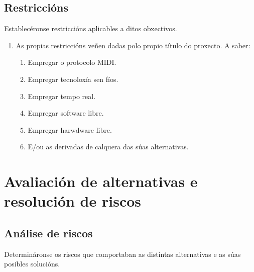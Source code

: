  \subsection{Restriccións}

 Establecéronse restriccións aplicables a ditos obxectivos.

 \begin{enumerate}
  \item As propias restriccións veñen dadas polo propio título do proxecto. A
        saber:
        \begin{enumerate}
         \item Empregar o protocolo MIDI.
         \item Empregar tecnoloxía sen fíos.
         \item Empregar tempo real.
         \item Empregar software libre.
         \item Empregar harwdware libre.
         \item E/ou as derivadas de calquera das súas alternativas.
        \end{enumerate}
 \end{enumerate}

\section{Avaliación de alternativas e resolución de riscos}

 \subsection{Análise de riscos}

 Determináronse os riscos que comportaban as distintas alternativas e as súas
 posibles solucións.


